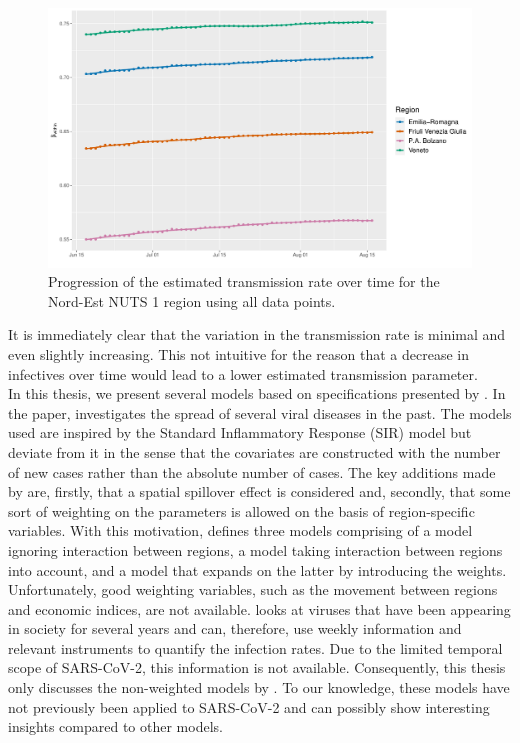 \documentclass[12pt]{article}
\begin{document}
	\begin{figure}[H]
	    \centering
        \includegraphics[width=0.92\linewidth]{output/model_within_lag14_betawithin_Nord-Est.pdf}
	    \caption{Progression of the estimated transmission rate over time for the Nord-Est NUTS 1 region using all data points.}
	    \label{fig:beta_within_over_time_nordest_not_rolling}
    \end{figure}
	
	It is immediately clear that the variation in the transmission rate is minimal and even slightly increasing. This not intuitive for the reason that a decrease in infectives over time would lead to a lower estimated transmission parameter. \\
	
	In this thesis, we present several models based on specifications presented by \textcite{adda2016economic}. In the paper, \textcite{adda2016economic} investigates the spread of several viral diseases in the past. The models used are inspired by the Standard Inflammatory Response (SIR) model but deviate from it in the sense that the covariates are constructed with the number of new cases rather than the absolute number of cases. The key additions made by \textcite{adda2016economic} are, firstly, that a spatial spillover effect is considered and, secondly, that some sort of weighting on the parameters is allowed on the basis of region-specific variables. With this motivation, \textcite{adda2016economic} defines three models comprising of a model ignoring interaction between regions, a model taking interaction between regions into account, and a model that expands on the latter by introducing the weights. Unfortunately, good weighting variables, such as the movement between regions and economic indices, are not available. \textcite{adda2016economic} looks at viruses that have been appearing in society for several years and can, therefore, use weekly information and relevant instruments to quantify the infection rates. Due to the limited temporal scope of SARS-CoV-2, this information is not available. Consequently, this thesis only discusses the non-weighted models by \textcite{adda2016economic}. To our knowledge, these models have not previously been applied to SARS-CoV-2 and can possibly show interesting insights compared to other models.
	
\end{document}
